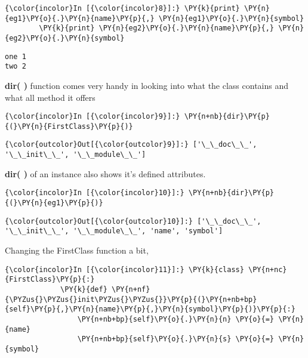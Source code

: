     \begin{Verbatim}[commandchars=\\\{\}]
{\color{incolor}In [{\color{incolor}8}]:} \PY{k}{print} \PY{n}{eg1}\PY{o}{.}\PY{n}{name}\PY{p}{,} \PY{n}{eg1}\PY{o}{.}\PY{n}{symbol}
        \PY{k}{print} \PY{n}{eg2}\PY{o}{.}\PY{n}{name}\PY{p}{,} \PY{n}{eg2}\PY{o}{.}\PY{n}{symbol}
\end{Verbatim}

    \begin{Verbatim}[commandchars=\\\{\}]
one 1
two 2
    \end{Verbatim}

    \textbf{dir( )} function comes very handy in looking into what the class
contains and what all method it offers

    \begin{Verbatim}[commandchars=\\\{\}]
{\color{incolor}In [{\color{incolor}9}]:} \PY{n+nb}{dir}\PY{p}{(}\PY{n}{FirstClass}\PY{p}{)}
\end{Verbatim}

            \begin{Verbatim}[commandchars=\\\{\}]
{\color{outcolor}Out[{\color{outcolor}9}]:} ['\_\_doc\_\_', '\_\_init\_\_', '\_\_module\_\_']
\end{Verbatim}
        
    \textbf{dir( )} of an instance also shows it's defined attributes.

    \begin{Verbatim}[commandchars=\\\{\}]
{\color{incolor}In [{\color{incolor}10}]:} \PY{n+nb}{dir}\PY{p}{(}\PY{n}{eg1}\PY{p}{)}
\end{Verbatim}

            \begin{Verbatim}[commandchars=\\\{\}]
{\color{outcolor}Out[{\color{outcolor}10}]:} ['\_\_doc\_\_', '\_\_init\_\_', '\_\_module\_\_', 'name', 'symbol']
\end{Verbatim}
        
    Changing the FirstClass function a bit,

    \begin{Verbatim}[commandchars=\\\{\}]
{\color{incolor}In [{\color{incolor}11}]:} \PY{k}{class} \PY{n+nc}{FirstClass}\PY{p}{:}
             \PY{k}{def} \PY{n+nf}{\PYZus{}\PYZus{}init\PYZus{}\PYZus{}}\PY{p}{(}\PY{n+nb+bp}{self}\PY{p}{,}\PY{n}{name}\PY{p}{,}\PY{n}{symbol}\PY{p}{)}\PY{p}{:}
                 \PY{n+nb+bp}{self}\PY{o}{.}\PY{n}{n} \PY{o}{=} \PY{n}{name}
                 \PY{n+nb+bp}{self}\PY{o}{.}\PY{n}{s} \PY{o}{=} \PY{n}{symbol}
\end{Verbatim}

